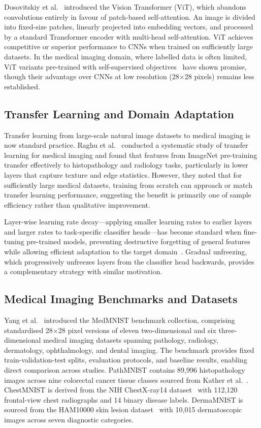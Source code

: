 Dosovitskiy et al.~\cite{dosovitskiy2020image} introduced the Vision Transformer (ViT), which abandons convolutions entirely in favour of patch-based self-attention. An image is divided into fixed-size patches, linearly projected into embedding vectors, and processed by a standard Transformer encoder with multi-head self-attention. ViT achieves competitive or superior performance to CNNs when trained on sufficiently large datasets. In the medical imaging domain, where labelled data is often limited, ViT variants pre-trained with self-supervised objectives~\cite{caron2021emerging} have shown promise, though their advantage over CNNs at low resolution (28$\times$28 pixels) remains less established.

\subsection{Transfer Learning and Domain Adaptation}

Transfer learning from large-scale natural image datasets to medical imaging is now standard practice. Raghu et al.~\cite{raghu2019transfusion} conducted a systematic study of transfer learning for medical imaging and found that features from ImageNet pre-training transfer effectively to histopathology and radiology tasks, particularly in lower layers that capture texture and edge statistics. However, they noted that for sufficiently large medical datasets, training from scratch can approach or match transfer learning performance, suggesting the benefit is primarily one of sample efficiency rather than qualitative improvement.

Layer-wise learning rate decay—applying smaller learning rates to earlier layers and larger rates to task-specific classifier heads—has become standard when fine-tuning pre-trained models, preventing destructive forgetting of general features while allowing efficient adaptation to the target domain~\cite{howard2018universal}. Gradual unfreezing, which progressively unfreezes layers from the classifier head backwards, provides a complementary strategy with similar motivation.

\subsection{Medical Imaging Benchmarks and Datasets}

Yang et al.~\cite{yang2021medmnist} introduced the MedMNIST benchmark collection, comprising standardised 28$\times$28 pixel versions of eleven two-dimensional and six three-dimensional medical imaging datasets spanning pathology, radiology, dermatology, ophthalmology, and dental imaging. The benchmark provides fixed train-validation-test splits, evaluation protocols, and baseline results, enabling direct comparison across studies. PathMNIST contains 89,996 histopathology images across nine colorectal cancer tissue classes sourced from Kather et al.~\cite{kather2019predicting}. ChestMNIST is derived from the NIH ChestX-ray14 dataset~\cite{wang2017chestx} with 112,120 frontal-view chest radiographs and 14 binary disease labels. DermaMNIST is sourced from the HAM10000 skin lesion dataset~\cite{tschandl2018ham10000} with 10,015 dermatoscopic images across seven diagnostic categories.


